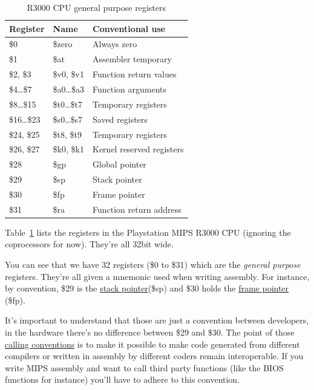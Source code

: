 \documentclass[a4paper]{article}
\begin{document}
\begin{table}[ht]
  \centering

  \begin{tabular}{ l | l | l }
    Register         & Name             & Conventional use          \\
    \hline
    \$0              & \$zero           & Always zero               \\
    \$1              & \$at             & Assembler temporary       \\
    \$2, \$3         & \$v0, \$v1       & Function return values    \\
    \$4\dots{}\$7    & \$a0\dots{}\$a3  & Function arguments        \\
    \$8\dots{}\$15   & \$t0\dots{}\$t7  & Temporary registers       \\
    \$16\dots{}\$23  & \$s0\dots{}\$s7  & Saved registers           \\
    \$24, \$25       & \$t8, \$t9       & Temporary registers       \\
    \$26, \$27       & \$k0, \$k1       & Kernel reserved registers \\
    \$28             & \$gp             & Global pointer            \\
    \$29             & \$sp             & Stack pointer             \\
    \$30             & \$fp             & Frame pointer             \\
    \$31             & \$ra             & Function return address   \\
  \end{tabular}

  \caption{R3000 CPU general purpose registers}
  \label{tab:cpuregs}
\end{table}

Table~\ref{tab:cpuregs} lists the registers in the Playstation MIPS
R3000 CPU (ignoring the coprocessors for now). They're all 32bit
wide.

You can see that we have 32 registers (\$0 to \$31) which are the
\emph{general purpose} registers. They're all given a mnemonic used
when writing assembly. For instance, by convention, \$29 is the
\href{https://en.wikipedia.org/wiki/Call_stack}{stack pointer}(\$sp)
and \$30 holds the
\href{https://en.wikipedia.org/wiki/Call_stack#FRAME-POINTER}{frame
  pointer} (\$fp).

It's important to understand that those are just a convention between
developers, in the hardware there's no difference between \$29 and
\$30. The point of those
\href{https://en.wikipedia.org/wiki/Calling_convention}{calling
  conventions} is to make it possible to make code generated from
different compilers or written in assembly by different coders remain
interoperable. If you write MIPS assembly and want to call third party
functions (like the BIOS functions for instance) you'll have to adhere
to this convention.
\end{document}
